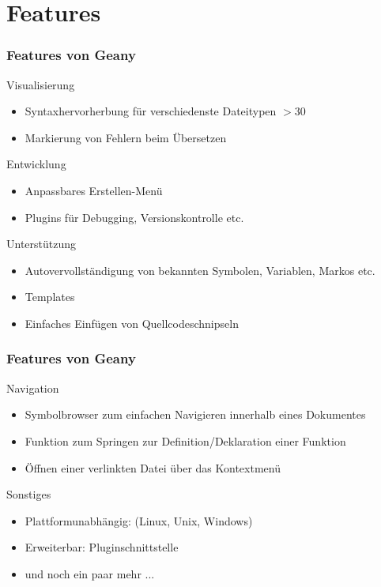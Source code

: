 \section{Features}
\begin{frame}[allowframebreak]
	\frametitle{Features von Geany}
	\begin{block}{Visualisierung}
		\begin{itemize}
			\item Syntaxhervorherbung für verschiedenste Dateitypen $>$30
			\item Markierung von Fehlern beim Übersetzen
		\end{itemize}
	\end{block}
	\begin{block}{Entwicklung}
		\begin{itemize}
			\item Anpassbares Erstellen-Menü
			\item Plugins für Debugging, Versionskontrolle etc.
		\end{itemize}
	\end{block}
	\begin{block}{Unterstützung}
		\begin{itemize}
			\item Autovervollständigung von bekannten Symbolen,
				  Variablen, Markos etc.
			\item Templates
			\item Einfaches Einfügen von Quellcodeschnipseln
		\end{itemize}
	\end{block}
\end{frame}
\begin{frame}[allowframebreak]
	\frametitle{Features von Geany}
	\begin{block}{Navigation}
		\begin{itemize}
			\item Symbolbrowser zum einfachen Navigieren innerhalb
			      eines Dokumentes
			\item Funktion zum Springen zur Definition/Deklaration
			      einer Funktion
			\item Öffnen einer verlinkten Datei über das Kontextmenü
		\end{itemize}
	\end{block}
	\begin{block}{Sonstiges}
		\begin{itemize}
			\item Plattformunabhängig: (Linux, Unix, Windows)
			\item Erweiterbar: Pluginschnittstelle
			\item und noch ein paar mehr ...
		\end{itemize}
	\end{block}
\end{frame}
